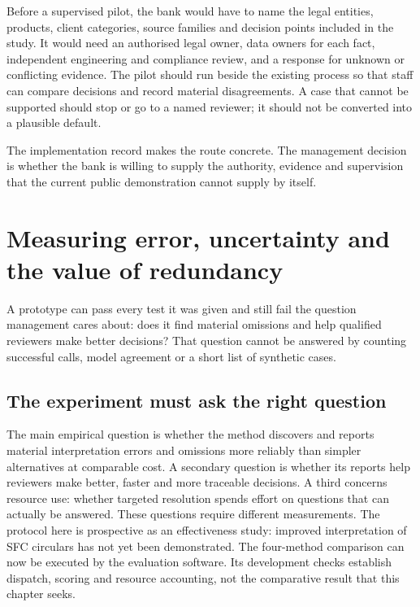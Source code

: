 \documentclass[12pt,a4paper,oneside,openany]{book}
\begin{document}
Before a supervised pilot, the bank would have to name the legal entities,
products, client categories, source families and decision points included in the
study. It would need an authorised legal owner, data owners for each fact,
independent engineering and compliance review, and a response for unknown or
conflicting evidence. The pilot should run beside the existing process so that
staff can compare decisions and record material disagreements. A case that cannot
be supported should stop or go to a named reviewer; it should not be converted
into a plausible default.

The implementation record makes the route concrete. The management decision is
whether the bank is willing to supply the authority, evidence and supervision
that the current public demonstration cannot supply by itself.

\chapter{Measuring error, uncertainty and the value of redundancy}
\label{ch:evaluation}

A prototype can pass every test it was given and still fail the question
management cares about: does it find material omissions and help qualified
reviewers make better decisions? That question cannot be answered by counting
successful calls, model agreement or a short list of synthetic cases.

\section{The experiment must ask the right question}
\label{merge:M09:00}


The main empirical question is whether the method discovers and reports material
interpretation errors and omissions more reliably than simpler alternatives at
comparable cost. A secondary question is whether its reports help reviewers make
better, faster and more traceable decisions. A third concerns resource use:
whether targeted resolution spends effort on questions that can actually be
answered. These questions require different measurements. The protocol here is
prospective as an effectiveness study: improved interpretation of SFC circulars
has not yet been demonstrated. The four-method comparison can now be executed
by the evaluation software. Its development checks establish dispatch, scoring
and resource accounting, not the comparative result that this chapter seeks.
\end{document}
